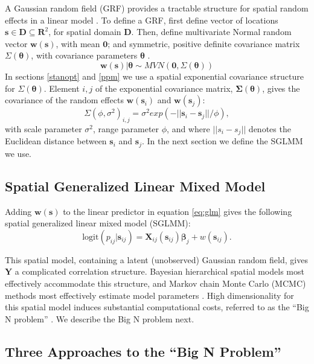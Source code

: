 A Gaussian random field (GRF) provides a tractable structure for spatial random effects in a linear model \citep{Gelfand2010}. To define a GRF, first define vector of locations $\pmb{s} \in \pmb{D} \subseteq \pmb{R}^{2}$, for spatial domain $\pmb{D}$. Then, define multivariate Normal random vector $\pmb{w}(\pmb{s})$, with mean $\pmb{0}$; and symmetric, positive definite covariance matrix $\Sigma(\pmb{\theta})$, with covariance parameters $\pmb{\theta}$ \citep{Haran2011}.
\begin{equation} \label{eq:w}
\pmb{w}(\pmb{s}) | \pmb{\theta} \sim MVN(\pmb{0}, \Sigma(\pmb{\theta})) 
\end{equation}
In sections \ref{stanopt} and \ref{ppm} we use a spatial exponential covariance structure for $\Sigma(\pmb{\theta})$. Element $i,j$ of the exponential covariance matrix, $\pmb{\Sigma}(\pmb{\theta})$, gives the covariance of the random effects $\pmb{w}(\pmb{s}_{i})$ and $\pmb{w}(\pmb{s}_{j})$:
\begin{equation} \label{eq:exp}
\Sigma(\phi, \sigma^{2})_{i,j} = \sigma^{2} exp(-||\pmb{s}_{i} - \pmb{s}_{j}||/\phi),
\end{equation}
with scale parameter $\sigma^{2}$, range parameter $\phi$, and where $||s_{i} - s_{j}||$ denotes the Euclidean distance between $\pmb{s}_{i}$ and $\pmb{s}_{j}$. In the next section we define the SGLMM we use.

\subsection{Spatial Generalized Linear Mixed Model}
Adding $\pmb{w}(\pmb{s})$ to the linear predictor in equation \ref{eq:glm} gives the following spatial generalized linear mixed model (SGLMM):
\begin{equation} \label{eq:SGLMM}
\text{logit}(p_{ij}|\pmb{s}_{ij}) = \pmb{X}_{ij}(\pmb{s}_{ij}) \pmb{\beta}_{j} + w(\pmb{s}_{ij}).
\end{equation}

This spatial model, containing a latent (unobserved) Gaussian random field, gives $\pmb{Y}$ a complicated correlation structure. Bayesian hierarchical spatial models most effectively accommodate this structure, and Markov chain Monte Carlo (MCMC) methods most effectively estimate model parameters \citep{Banerjee2014}. High dimensionality for this spatial model induces substantial computational costs, referred to as the ``Big N problem'' \citep{Lindgren2011}. We describe the Big N problem next.

\subsection{Three Approaches to the ``Big N Problem''}

